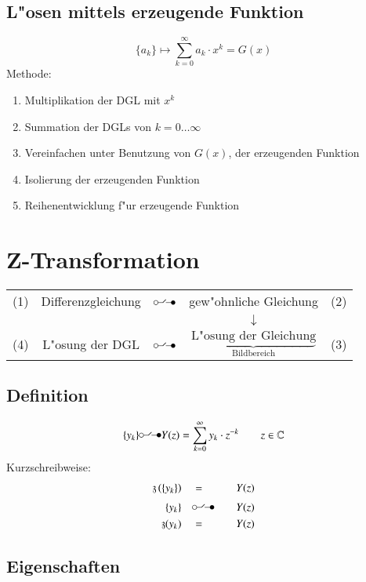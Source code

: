 \subsection{L"osen mittels erzeugende Funktion}
\begin{equation}
	\{a_k\}\mapsto\sum\limits_{k=0}^\infty a_k\cdot x^k = G(x)
\end{equation}
\noindent Methode:
\begin{enumerate}
	\item Multiplikation der DGL mit $x^k$
	\item Summation der DGLs von $k=0\ldots\infty$
	\item Vereinfachen unter Benutzung von $G(x)$, der erzeugenden Funktion
	\item Isolierung der erzeugenden Funktion
	\item Reihenentwicklung f"ur erzeugende Funktion
\end{enumerate}

\section{Z-Transformation}
\begin{center}\begin{tabular}{c c c c c}
	(1) & Differenzgleichung & $\ztransf$ & gew"ohnliche Gleichung & (2) \\
	& & & $\downarrow$ & \\
	(4) & L"osung der DGL & $\ztransf$ & $\underbrace{\text{L"osung der Gleichung}}_{\text{Bildbereich}}$ & (3) \\
\end{tabular}\end{center}

\subsection{Definition}
\begin{equation}
	\{y_k\}\ztransf Y(z)=\sum\limits_{k=0}^\infty y_k\cdot z^{-k}\qquad z\in\mathbb{C}
\end{equation}
\noindent Kurzschreibweise:
\begin{eqnarray*}
	\ztf\left(\{y_k\}\right) \quad & = & \quad Y(z) \\
	\{y_k\}\quad & \ztransf & \quad Y(z) \\
	\ztf(y_k) \quad & = & \quad Y(z)
\end{eqnarray*}

\subsection{Eigenschaften}

